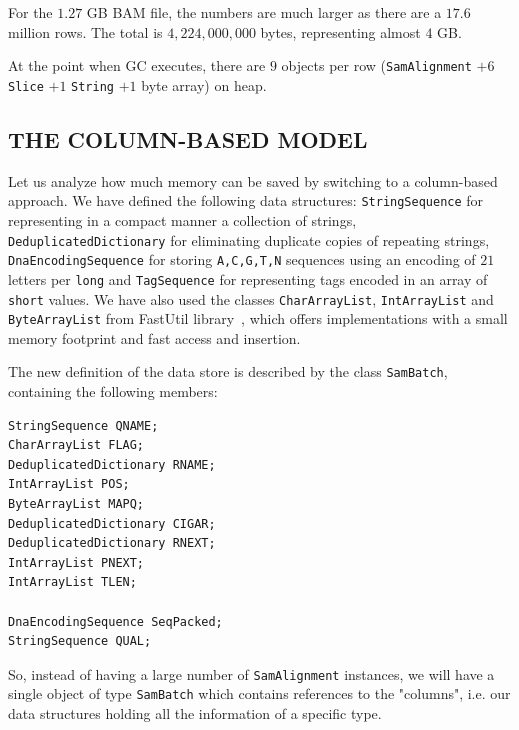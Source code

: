 \documentclass[a4paper,twoside]{article}
\begin{document}
For the $1.27$ GB BAM file, the numbers are much larger as there are a $17.6$ million rows.
The total is $4,224,000,000$ bytes, representing almost $4$ GB\@.


At the point when GC executes, there are $9$ objects per row 
({\texttt{SamAlignment}} $+ 6$ {\texttt{Slice}} $+ 1$ {\texttt{String}} $+ 1$ byte array) on heap.




\subsection{\uppercase{The Column-Based Model}} 
\label{model:column}

Let us analyze how much memory can be saved by switching to a column-based approach.
We have defined the following data structures: {\texttt{StringSequence}} for representing in a compact manner a collection of strings, {\texttt{DeduplicatedDictionary}} for eliminating duplicate copies of repeating strings, {\texttt{DnaEncodingSequence}} for storing {\texttt{A,C,G,T,N}} sequences using an encoding of $21$ letters per {\texttt{long}} and {\texttt{TagSequence}} for representing tags encoded in an array of {\texttt{short}} values.
We have also used the classes {\texttt{CharArrayList}}, {\texttt{IntArrayList}} and {\texttt{ByteArrayList}} from FastUtil library~\cite{fastutil}, which offers implementations with a small memory footprint and fast access and insertion.

The new definition of the data store is described by the class {\texttt{SamBatch}}, containing the following members:
\begin{small}
\begin{verbatim}
StringSequence QNAME;
CharArrayList FLAG;
DeduplicatedDictionary RNAME;
IntArrayList POS;
ByteArrayList MAPQ;
DeduplicatedDictionary CIGAR;
DeduplicatedDictionary RNEXT;
IntArrayList PNEXT;
IntArrayList TLEN;

DnaEncodingSequence SeqPacked;
StringSequence QUAL;
\end{verbatim}
\end{small}

So, instead of having a large number of {\texttt{SamAlignment}} instances, we will have a single object of type {\texttt{SamBatch}} which contains references to the "columns", i.e. our data structures holding all the information of a specific type.
\end{document}
